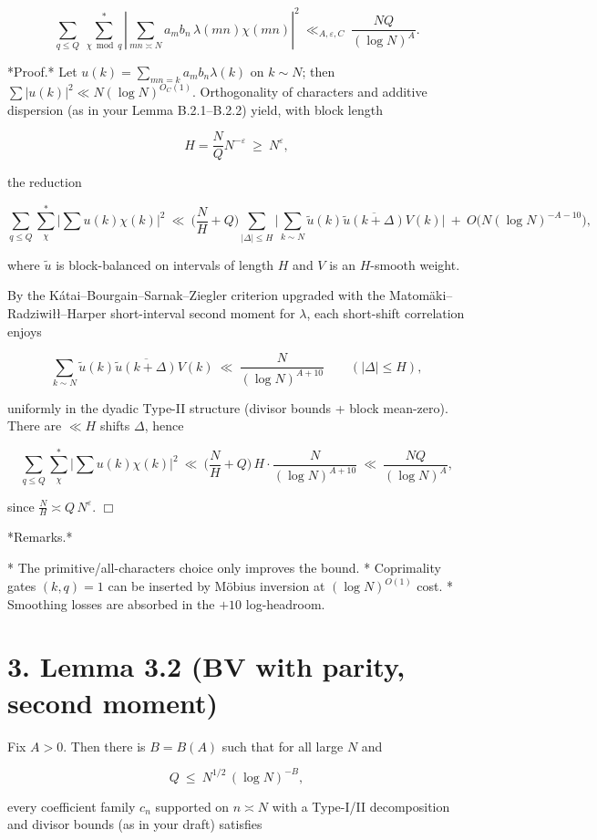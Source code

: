 \documentclass[11pt]{article}
\theoremstyle{definition}
\theoremstyle{remark}
\begin{document}
$$
\sum_{q\le Q}\ \sum_{\chi\bmod q}^{\!*}
\left|\sum_{mn\asymp N} a_m b_n\,\lambda(mn)\chi(mn)\right|^2
\ \ll_{A,\varepsilon,C}\ \frac{NQ}{(\log N)^{A}}.
$$

*Proof.* Let $u(k)=\sum_{mn=k}a_m b_n \lambda(k)$ on $k\sim N$; then $\sum |u(k)|^2\ll N(\log N)^{O_C(1)}$. Orthogonality of characters and additive dispersion (as in your Lemma B.2.1–B.2.2) yield, with block length

$$
H=\frac{N}{Q}N^{-\varepsilon}\ \ge\ N^{\varepsilon},
$$

the reduction

$$
\sum_{q\le Q}\sum_{\chi}^{*}\Big|\sum u(k)\chi(k)\Big|^2
\ \ll\ \Big(\frac{N}{H}+Q\Big)\!
\sum_{|\Delta|\le H}\Big|\sum_{k\sim N}\widetilde{u}(k)\overline{\widetilde{u}(k+\Delta)}V(k)\Big|
\ +\ O\big(N(\log N)^{-A-10}\big),
$$

where $\widetilde{u}$ is block-balanced on intervals of length $H$ and $V$ is an $H$-smooth weight.

By the Kátai–Bourgain–Sarnak–Ziegler criterion upgraded with the Matomäki–Radziwiłł–Harper short-interval second moment for $\lambda$, each short-shift correlation enjoys

$$
\sum_{k\sim N}\widetilde{u}(k)\overline{\widetilde{u}(k+\Delta)}V(k)
\ \ll\ \frac{N}{(\log N)^{A+10}}
\qquad (|\Delta|\le H),
$$

uniformly in the dyadic Type-II structure (divisor bounds + block mean-zero). There are $\ll H$ shifts $\Delta$, hence

$$
\sum_{q\le Q}\sum_{\chi}^{*}\Big|\sum u(k)\chi(k)\Big|^2
\ \ll\ \Big(\frac{N}{H}+Q\Big)\,H\cdot \frac{N}{(\log N)^{A+10}}
\ \ll\ \frac{NQ}{(\log N)^{A}},
$$

since $\frac{N}{H}\asymp Q\,N^{\varepsilon}$. $\Box$

*Remarks.*

* The primitive/all-characters choice only improves the bound.
* Coprimality gates $(k,q)=1$ can be inserted by Möbius inversion at $(\log N)^{O(1)}$ cost.
* Smoothing losses are absorbed in the $+10$ log-headroom.


\section*{3. Lemma 3.2 (BV with parity, second moment)}
Fix $A>0$. Then there is $B=B(A)$ such that for all large $N$ and

$$
Q\ \le\ N^{1/2}\,(\log N)^{-B},
$$

every coefficient family $c_n$ supported on $n\asymp N$ with a Type-I/II decomposition and divisor bounds (as in your draft) satisfies
\end{document}
